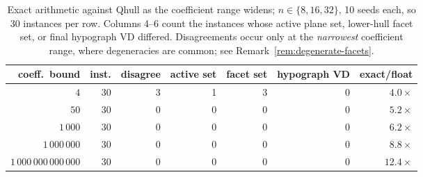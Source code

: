 \begin{table}[htbp]
\centering
\begin{tabular}{rrrrrrr}
\toprule
coeff.\ bound & inst. & disagree & active set & facet set & hypograph VD & exact/float \\
\midrule
$4$ & 30 & 3 & 1 & 3 & 0 & $4.0\times$ \\
$50$ & 30 & 0 & 0 & 0 & 0 & $5.2\times$ \\
$1\,000$ & 30 & 0 & 0 & 0 & 0 & $6.2\times$ \\
$1\,000\,000$ & 30 & 0 & 0 & 0 & 0 & $8.8\times$ \\
$1\,000\,000\,000\,000$ & 30 & 0 & 0 & 0 & 0 & $12.4\times$ \\
\bottomrule
\end{tabular}
\caption{Exact arithmetic against Qhull as the coefficient range widens; $n \in \{8,16,32\}$, 10 seeds each, so 30 instances per row. Columns 4--6 count the instances whose active plane set, lower-hull facet set, or final hypograph VD differed. Disagreements occur only at the \emph{narrowest} coefficient range, where degeneracies are common; see Remark~\ref{rem:degenerate-facets}.}
\label{tab:env-arith}
\end{table}

